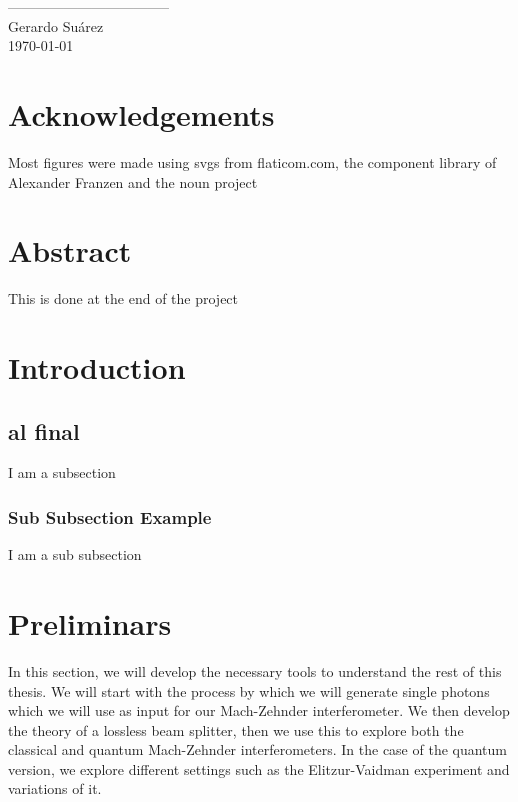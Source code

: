 \documentclass[12pt]{book}
\begin{document}
\vspace{2cm}
\begin{flushright}
-----------------------------------\\
Gerardo Suárez\\
\today
\end{flushright}
\pagebreak

\section*{Acknowledgements}
Most figures were made using svgs from flaticom.com, the component library of Alexander Franzen and the noun project
\pagebreak

\listoffigures
\pagebreak
 
\listoftables
\pagebreak


\tableofcontents
\pagebreak

\section*{Abstract}
This is done at the end of the project
\pagebreak




\section{Introduction}
\subsection{al final}
I am a subsection
\subsubsection{Sub Subsection Example}
I am a sub subsection
\pagebreak





\section{Preliminars}

In this section, we will develop the necessary tools to understand the rest of this thesis. We will start with the process by which we will generate single photons which we will use as input for our Mach-Zehnder interferometer. We then develop the theory of a lossless beam splitter, then we use this to explore both the classical and quantum Mach-Zehnder interferometers. In the case of the quantum version, we explore different settings such as the Elitzur-Vaidman experiment and variations of it.
\end{document}

